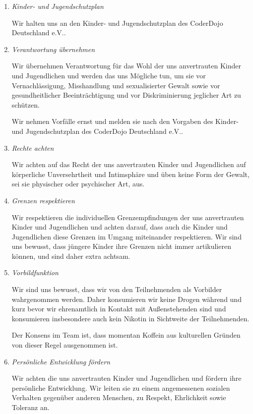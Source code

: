 \begin{enumerate}
    \item \textit{Kinder- und Jugendschutzplan}

    Wir halten uns an den Kinder- und Jugendschutzplan des CoderDojo Deutschland e.V..

    \item \textit{Verantwortung übernehmen}

    Wir übernehmen Verantwortung für das Wohl der uns anvertrauten Kinder und Jugendlichen und werden das uns Mögliche tun, um sie vor Vernachlässigung, Misshandlung und sexualisierter Gewalt sowie vor gesundheitlicher Beeinträchtigung und vor Diskriminierung jeglicher Art zu schützen.

    Wir nehmen Vorfälle ernst und melden sie nach den Vorgaben des Kinder- und Jugendschutzplan des CoderDojo Deutschland e.V..

    \item \textit{Rechte achten}

    Wir achten auf das Recht der uns anvertrauten Kinder und Jugendlichen auf körperliche Unversehrtheit und Intimsphäre und üben keine Form der Gewalt, sei sie physischer oder psychischer Art, aus.

    \item \textit{Grenzen respektieren}

    Wir respektieren die individuellen Grenzempfindungen der uns anvertrauten Kinder und Jugendlichen und achten darauf, dass auch die Kinder und Jugendlichen diese Grenzen im Umgang miteinander respektieren.
    Wir sind uns bewusst, dass jüngere Kinder ihre Grenzen nicht immer artikulieren können, und sind daher extra achtsam.

    \item \textit{Vorbildfunktion}

    Wir sind uns bewusst, dass wir von den Teilnehmenden als Vorbilder wahrgenommen werden.
    Daher konsumieren wir keine Drogen während und kurz bevor wir ehrenamtlich in Kontakt mit Außenstehenden sind und konsumieren insbesondere auch kein Nikotin in Sichtweite der Teilnehmenden.

    Der Konsens im Team ist, dass momentan Koffein aus kulturellen Gründen von dieser Regel ausgenommen ist.

    \item \textit{Persönliche Entwicklung fördern}

    Wir achten die uns anvertrauten Kinder und Jugendlichen und fördern ihre persönliche Entwicklung.
    Wir leiten sie zu einem angemessenen sozialen Verhalten gegenüber anderen Menschen, zu Respekt, Ehrlichkeit sowie Toleranz an.


\end{enumerate}
